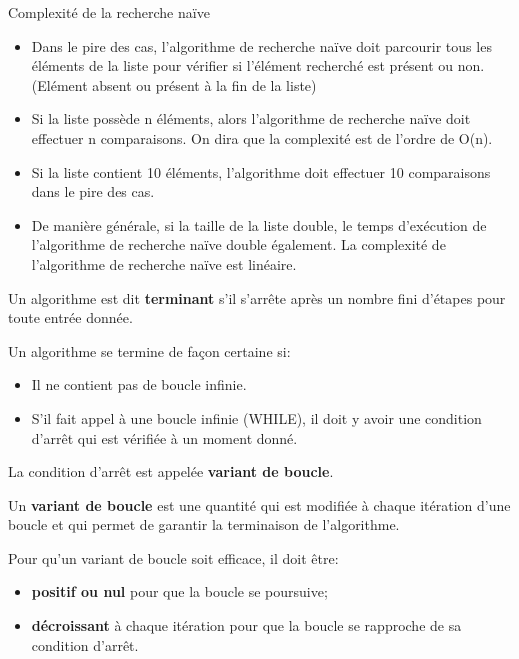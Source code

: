 \begin{easybox}{Complexité de la recherche naïve}{}
	
\begin{itemize}
	\item Dans le pire des cas, l'algorithme de recherche naïve doit parcourir tous les éléments de la liste pour vérifier si l'élément recherché est présent ou non. (Elément absent ou présent à la fin de la liste)
	\item Si la liste possède n éléments, alors l'algorithme de recherche naïve doit effectuer n comparaisons. On dira que la complexité est de l'ordre de O(n).
	\item Si la liste contient 10 éléments, l'algorithme doit effectuer 10 comparaisons dans le pire des cas. 
	\item De manière générale, si la taille de la liste double, le temps d'exécution de l'algorithme de recherche naïve double également. La complexité de l'algorithme de recherche naïve est linéaire.
\end{itemize}
	
\end{easybox}


\begin{definition}{}
	Un algorithme est dit \textbf{terminant} s'il s'arrête après un nombre fini d'étapes pour toute entrée donnée. 

	Un algorithme se termine de façon certaine si:
\begin{itemize}
\item Il ne contient pas de boucle infinie.
\item S'il fait appel à une boucle infinie (WHILE), il doit y avoir une condition d'arrêt qui est vérifiée à un moment donné.
\end{itemize}

La condition d'arrêt est appelée \textbf{variant de boucle}.	
\end{definition}

\pagebreak

\begin{definition}{}
	Un \textbf{variant de boucle} est une quantité qui est modifiée à chaque itération d'une boucle et qui permet de garantir la terminaison de l'algorithme. 

	Pour qu'un variant de boucle soit efficace, il doit être:
\begin{itemize}
	\item \textbf{positif ou nul} pour que la boucle se poursuive;
	\item \textbf{décroissant} à chaque itération pour que la boucle se rapproche de sa condition d'arrêt.
\end{itemize}
\end{definition}

